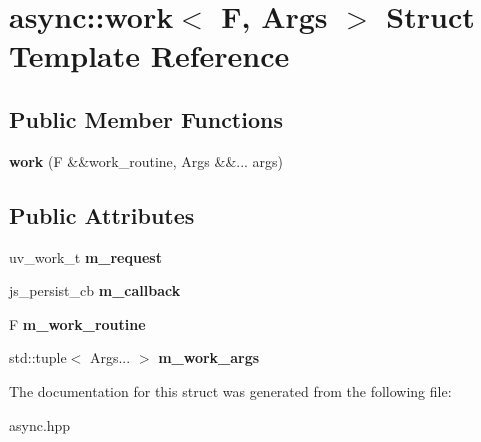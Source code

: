 \hypertarget{structasync_1_1work}{}\section{async\+:\+:work$<$ F, Args $>$ Struct Template Reference}
\label{structasync_1_1work}
\subsection*{Public Member Functions}
\begin{DoxyCompactItemize}
\item 
\mbox{\label{structasync_1_1work_a95ae3bc60696f23f55113ee489bdfbf0}} 
{\bfseries work} (F \&\&work\+\_\+routine, Args \&\&... args)
\end{DoxyCompactItemize}
\subsection*{Public Attributes}
\begin{DoxyCompactItemize}
\item 
\mbox{\label{structasync_1_1work_a718407ebe74d4d16540444560b44727d}} 
uv\+\_\+work\+\_\+t {\bfseries m\+\_\+request}
\item 
\mbox{\label{structasync_1_1work_af18ee6164b7b2a244e746d8405ed8c02}} 
js\+\_\+persist\+\_\+cb {\bfseries m\+\_\+callback}
\item 
\mbox{\label{structasync_1_1work_a1b466f9efcce8d24660720f11f759a61}} 
F {\bfseries m\+\_\+work\+\_\+routine}
\item 
\mbox{\label{structasync_1_1work_a7881da189c74cfc6458831277cb71205}} 
std\+::tuple$<$ Args... $>$ {\bfseries m\+\_\+work\+\_\+args}
\end{DoxyCompactItemize}


The documentation for this struct was generated from the following file\+:\begin{DoxyCompactItemize}
\item 
async.\+hpp\end{DoxyCompactItemize}
